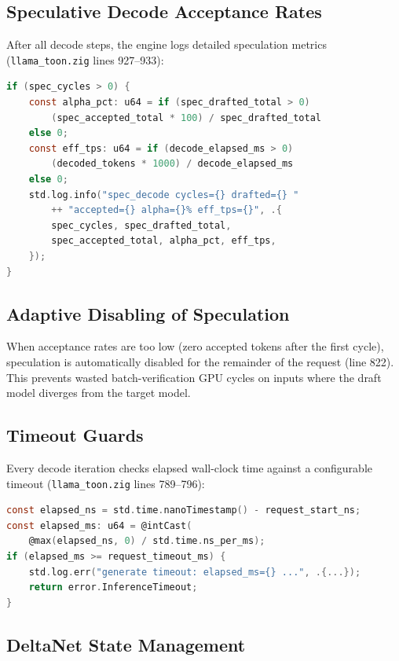 \documentclass[11pt]{article}
\begin{document}
\subsection{Speculative Decode Acceptance Rates}

After all decode steps, the engine logs detailed speculation metrics
(\texttt{llama\_toon.zig} lines 927--933):

\begin{lstlisting}[language=C,caption={Speculation metrics (llama\_toon.zig:927--933)}]
if (spec_cycles > 0) {
    const alpha_pct: u64 = if (spec_drafted_total > 0)
        (spec_accepted_total * 100) / spec_drafted_total
    else 0;
    const eff_tps: u64 = if (decode_elapsed_ms > 0)
        (decoded_tokens * 1000) / decode_elapsed_ms
    else 0;
    std.log.info("spec_decode cycles={} drafted={} "
        ++ "accepted={} alpha={}% eff_tps={}", .{
        spec_cycles, spec_drafted_total,
        spec_accepted_total, alpha_pct, eff_tps,
    });
}
\end{lstlisting}

\subsection{Adaptive Disabling of Speculation}

When acceptance rates are too low (zero accepted tokens after the first cycle),
speculation is automatically disabled for the remainder of the request
(line 822). This prevents wasted batch-verification GPU cycles on inputs
where the draft model diverges from the target model.

\subsection{Timeout Guards}

Every decode iteration checks elapsed wall-clock time against a configurable
timeout (\texttt{llama\_toon.zig} lines 789--796):

\begin{lstlisting}[language=C,caption={Timeout guard (llama\_toon.zig:789--796)}]
const elapsed_ns = std.time.nanoTimestamp() - request_start_ns;
const elapsed_ms: u64 = @intCast(
    @max(elapsed_ns, 0) / std.time.ns_per_ms);
if (elapsed_ms >= request_timeout_ms) {
    std.log.err("generate timeout: elapsed_ms={} ...", .{...});
    return error.InferenceTimeout;
}
\end{lstlisting}

\subsection{DeltaNet State Management}
\end{document}
